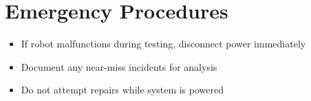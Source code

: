 \section{Emergency Procedures}

\begin{itemize}
    \item If robot malfunctions during testing, disconnect power immediately
    \item Document any near-miss incidents for analysis
    \item Do not attempt repairs while system is powered
\end{itemize}





